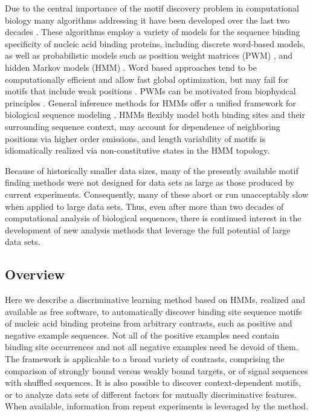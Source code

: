 \documentclass[a4paper]{article}
\begin{document}
Due to the central importance of the motif discovery problem in computational biology many algorithms addressing it have been developed over the last two decades \cite{Das2007}.
These algorithms employ  a variety of models for the sequence binding specificity of nucleic acid binding proteins, including discrete word-based models, as well as probabilistic models such as position weight matrices (PWM) \cite{Stormo1998}, and hidden Markov models (HMM) \cite{Rabiner1989}.
Word based approaches tend to be computationally efficient and allow fast global optimization, but may fail for motifs that include weak positions \cite{Das2007}.
PWMs can be motivated from biophysical principles \cite{Berg1987,Stormo2000,Foat2006}.
General inference methods for HMMs offer a unified framework for biological sequence modeling \cite{Durbin1998}.
HMMs flexibly model both binding sites and their surrounding sequence context, may account for dependence of neighboring positions via higher order emissions, and length variability of motifs is idiomatically realized via non-constitutive states in the HMM topology.

Because of historically smaller data sizes, many of the presently available motif finding methods were not designed for data sets as large as those produced by current experiments.
Consequently, many of these abort or run unacceptably slow when applied to large data sets.
Thus, even after more than two decades of computational analysis of biological sequences, there is continued interest in the development of new analysis methods that leverage the full potential of large data sets.

\subsection{Overview}
Here we describe a discriminative learning method based on HMMs, realized and available as free software, to automatically discover binding site sequence motifs of nucleic acid binding proteins from arbitrary contrasts,
such as positive and negative example sequences.
Not all of the positive examples need contain binding site occurrences and not all negative examples need be devoid of them.
The framework is applicable to a broad variety of contrasts, comprising the comparison of strongly bound versus weakly bound targets, or of signal sequences with shuffled sequences.
It is also possible to discover context-dependent motifs, or to analyze data sets of different factors for mutually discriminative features.
When available, information from repeat experiments is leveraged by the method.
\end{document}

